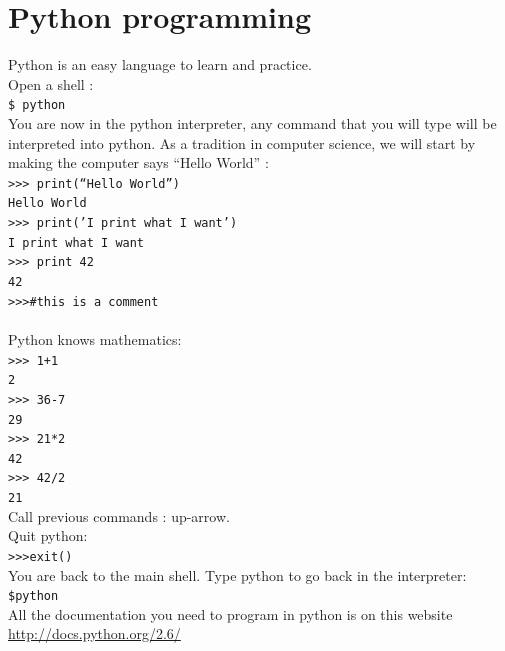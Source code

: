 \documentclass[article,10pt]{scrartcl}
\begin{document}
\section{Python programming}
Python is an easy language to learn and practice. \\
Open a shell :\\
\texttt{\$ python}\\
You are now in the python interpreter, any command that you will type will be interpreted into python. As a tradition in computer science, we will start by making the computer says ``Hello World'' :\\
\texttt{>>> print(``Hello World'')}\\
\texttt{Hello World}\\
\texttt{>>> print('I print what I want')}\\
\texttt{I print what I want}\\
\texttt{>>> print 42}\\
\texttt{42}\\
\texttt{>>>\#this is a comment}\\
\\
Python knows mathematics:\\
\texttt{>>> 1+1}\\
\texttt{2}\\
\texttt{>>> 36-7}\\
\texttt{29}\\
\texttt{>>> 21*2}\\
\texttt{42}\\
\texttt{>>> 42/2}\\
\texttt{21}\\


Call previous commands : up-arrow.\\
Quit python:\\
\texttt{>>>exit()}\\
You are back to the main shell. Type python to go back in the interpreter:\\
\texttt{\$python}\\
All the documentation you need to program in python is on this website \url{http://docs.python.org/2.6/}
\end{document}
